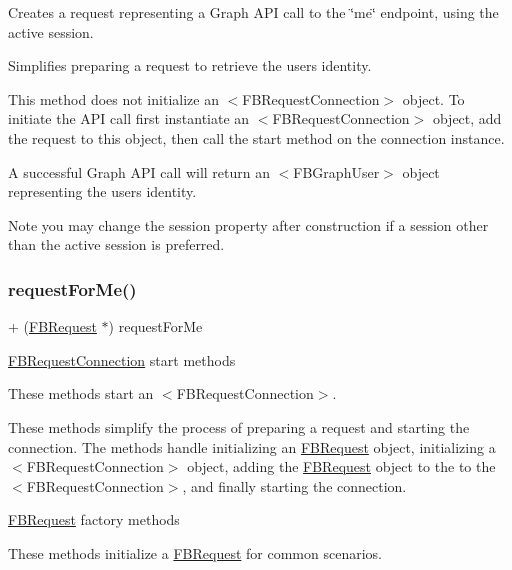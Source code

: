 Creates a request representing a Graph A\+PI call to the \char`\"{}me\char`\"{} endpoint, using the active session.

Simplifies preparing a request to retrieve the user\textquotesingle{}s identity.

This method does not initialize an $<$\+F\+B\+Request\+Connection$>$ object. To initiate the A\+PI call first instantiate an $<$\+F\+B\+Request\+Connection$>$ object, add the request to this object, then call the {\ttfamily start} method on the connection instance.

A successful Graph A\+PI call will return an $<$\+F\+B\+Graph\+User$>$ object representing the user\textquotesingle{}s identity.

Note you may change the session property after construction if a session other than the active session is preferred. \mbox{\label{interfaceFBRequest_a1a8fb083c2d09cbbc5ae9afd33e2381f}} 
\subsubsection{\texorpdfstring{request\+For\+Me()}{requestForMe()}\hspace{0.1cm}{\footnotesize\ttfamily [3/5]}}
{\footnotesize\ttfamily + (\hyperlink{interfaceFBRequest}{F\+B\+Request} $\ast$) request\+For\+Me \begin{DoxyParamCaption}{ }\end{DoxyParamCaption}}

\hyperlink{interfaceFBRequestConnection}{F\+B\+Request\+Connection} start methods

These methods start an $<$\+F\+B\+Request\+Connection$>$.

These methods simplify the process of preparing a request and starting the connection. The methods handle initializing an {\ttfamily \hyperlink{interfaceFBRequest}{F\+B\+Request}} object, initializing a $<$\+F\+B\+Request\+Connection$>$ object, adding the {\ttfamily \hyperlink{interfaceFBRequest}{F\+B\+Request}} object to the to the $<$\+F\+B\+Request\+Connection$>$, and finally starting the connection.

\hyperlink{interfaceFBRequest}{F\+B\+Request} factory methods

These methods initialize a {\ttfamily \hyperlink{interfaceFBRequest}{F\+B\+Request}} for common scenarios.

